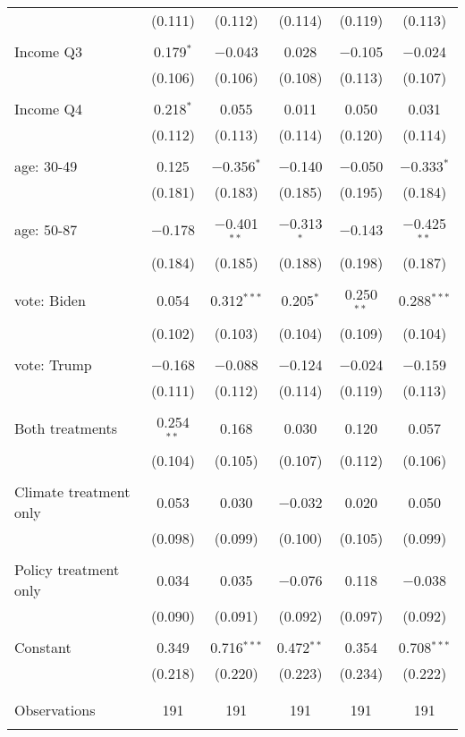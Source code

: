 \begin{tabular}{@{\extracolsep{5pt}}lccccc}
  & (0.111) & (0.112) & (0.114) & (0.119) & (0.113) \\ 
  & & & & & \\ 
 Income Q3 & 0.179$^{*}$ & $-$0.043 & 0.028 & $-$0.105 & $-$0.024 \\ 
  & (0.106) & (0.106) & (0.108) & (0.113) & (0.107) \\ 
  & & & & & \\ 
 Income Q4 & 0.218$^{*}$ & 0.055 & 0.011 & 0.050 & 0.031 \\ 
  & (0.112) & (0.113) & (0.114) & (0.120) & (0.114) \\ 
  & & & & & \\ 
 age: 30-49 & 0.125 & $-$0.356$^{*}$ & $-$0.140 & $-$0.050 & $-$0.333$^{*}$ \\ 
  & (0.181) & (0.183) & (0.185) & (0.195) & (0.184) \\ 
  & & & & & \\ 
 age: 50-87 & $-$0.178 & $-$0.401$^{**}$ & $-$0.313$^{*}$ & $-$0.143 & $-$0.425$^{**}$ \\ 
  & (0.184) & (0.185) & (0.188) & (0.198) & (0.187) \\ 
  & & & & & \\ 
 vote: Biden & 0.054 & 0.312$^{***}$ & 0.205$^{*}$ & 0.250$^{**}$ & 0.288$^{***}$ \\ 
  & (0.102) & (0.103) & (0.104) & (0.109) & (0.104) \\ 
  & & & & & \\ 
 vote: Trump & $-$0.168 & $-$0.088 & $-$0.124 & $-$0.024 & $-$0.159 \\ 
  & (0.111) & (0.112) & (0.114) & (0.119) & (0.113) \\ 
  & & & & & \\ 
 Both treatments & 0.254$^{**}$ & 0.168 & 0.030 & 0.120 & 0.057 \\ 
  & (0.104) & (0.105) & (0.107) & (0.112) & (0.106) \\ 
  & & & & & \\ 
 Climate treatment only & 0.053 & 0.030 & $-$0.032 & 0.020 & 0.050 \\ 
  & (0.098) & (0.099) & (0.100) & (0.105) & (0.099) \\ 
  & & & & & \\ 
 Policy treatment only & 0.034 & 0.035 & $-$0.076 & 0.118 & $-$0.038 \\ 
  & (0.090) & (0.091) & (0.092) & (0.097) & (0.092) \\ 
  & & & & & \\ 
 Constant & 0.349 & 0.716$^{***}$ & 0.472$^{**}$ & 0.354 & 0.708$^{***}$ \\ 
  & (0.218) & (0.220) & (0.223) & (0.234) & (0.222) \\ 
  & & & & & \\ 
\hline \\[-1.8ex] 

Observations & 191 & 191 & 191 & 191 & 191 \\ 
\hline 
\hline \\[-1.8ex] 
\end{tabular} 